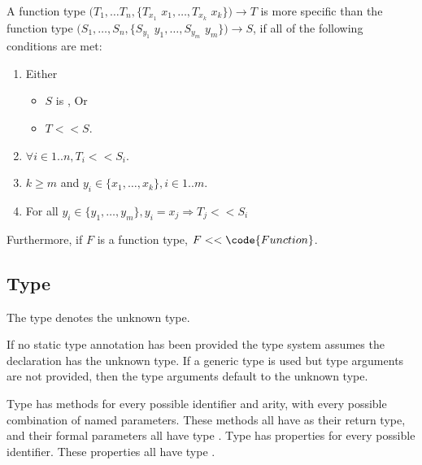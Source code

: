 \documentclass{article}
\begin{document}
\LMHash{}
A function type $(T_1, \ldots T_n, \{T_{x_1}$ $x_1, \ldots, T_{x_k}$ $x_k\}) \rightarrow T$ is more specific than the function type $(S_1, \ldots, S_n, \{S_{y_1}$ $y_1, \ldots, S_{y_m}$ $y_m\}) \rightarrow S$, if all of the following conditions are met:
\begin{enumerate}
\item Either
\begin{itemize}
\item $S$ is \VOID{}, Or
\item $T << S$.
\end{itemize}
\item $\forall i \in 1 .. n, T_i << S_i$.
\item $k \ge m$ and $y_i \in \{x_1, \ldots, x_k\}, i \in 1 .. m$.
\item For all $y_i \in \{y_1, \ldots, y_m\}, y_i = x_j \Rightarrow T_j << S_i$
\end{enumerate}

\LMHash{}
Furthermore, if $F$ is a function type, $F << \code{Function}$.


\subsection{Type \DYNAMIC{}}

\LMHash{}
The type \DYNAMIC{} denotes the unknown type.

\LMHash{}
If no static type annotation has been provided the type system assumes the declaration has the unknown type.
If a generic type is used but type arguments are not provided, then the type arguments default to the unknown type.


\LMHash{}
Type \DYNAMIC{} has methods for every possible identifier and arity, with every possible combination of named parameters.
These methods all have \DYNAMIC{} as their return type, and their formal parameters all have type \DYNAMIC{}.
Type \DYNAMIC{} has properties for every possible identifier.
These properties all have type \DYNAMIC{}.
\end{document}
